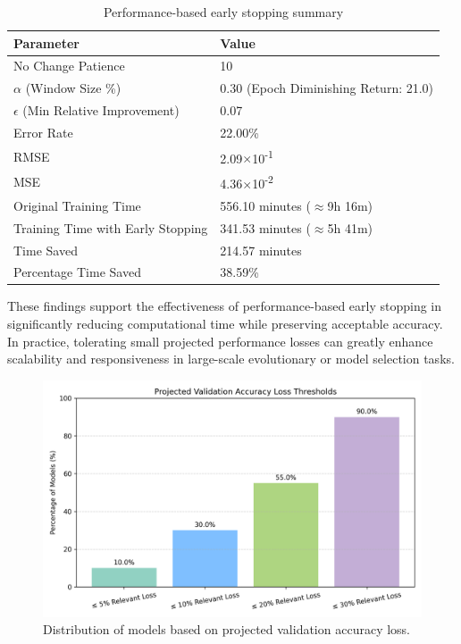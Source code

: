 \begin{table}[ht]
\centering
\begin{tabular}{ll}
\toprule
\textbf{Parameter} & \textbf{Value} \\
\midrule
No Change Patience & 10 \\
$\alpha$ (Window Size \%) & 0.30 (Epoch Diminishing Return: 21.0) \\
$\epsilon$ (Min Relative Improvement) & 0.07 \\
Error Rate & 22.00\% \\
RMSE & 2.09$\times$10\textsuperscript{-1} \\
MSE & 4.36$\times$10\textsuperscript{-2} \\
Original Training Time & 556.10 minutes ($\approx$9h 16m) \\
Training Time with Early Stopping & 341.53 minutes ($\approx$5h 41m) \\
Time Saved & 214.57 minutes \\
Percentage Time Saved & 38.59\% \\
\bottomrule
\end{tabular}
\caption{Performance-based early stopping summary}
\label{tab:performance_stopping_summary}
\end{table}

These findings support the effectiveness of performance-based early stopping in significantly reducing computational time while preserving acceptable accuracy. In practice, tolerating small projected performance losses can greatly enhance scalability and responsiveness in large-scale evolutionary or model selection tasks.


\begin{figure}[ht]
    \centering
    \includegraphics[width=0.85\linewidth]{Pictures/val_accuracy_loss_percentages.png}
    \caption{Distribution of models based on projected validation accuracy loss.}
    \label{fig:performanceStop}
\end{figure}


